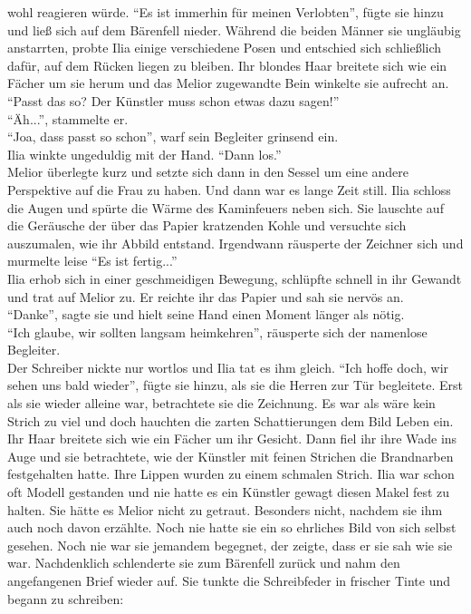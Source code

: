 wohl reagieren würde. ``Es ist immerhin für meinen Verlobten'', fügte sie hinzu und ließ sich auf 
dem Bärenfell nieder. Während die beiden Männer sie ungläubig anstarrten, probte Ilia einige 
verschiedene Posen und entschied sich schließlich dafür, auf dem Rücken liegen zu bleiben. Ihr 
blondes Haar breitete sich wie ein Fächer um sie herum und das Melior zugewandte Bein winkelte sie 
aufrecht an. ``Passt das so? Der Künstler muss schon etwas dazu sagen!''\\
``Äh...'', stammelte er.\\
``Joa, dass passt so schon'', warf sein Begleiter grinsend ein.\\
Ilia winkte ungeduldig mit der Hand. ``Dann los.''\\
Melior überlegte kurz und setzte sich dann in den Sessel um eine andere Perspektive auf die Frau zu 
haben. Und dann war es lange Zeit still. Ilia schloss die Augen und spürte die Wärme des 
Kaminfeuers neben sich. Sie lauschte auf die Geräusche der über das Papier kratzenden Kohle und 
versuchte sich auszumalen, wie ihr Abbild entstand. Irgendwann räusperte der Zeichner sich und 
murmelte leise ``Es ist fertig...''\\
Ilia erhob sich in einer geschmeidigen Bewegung, schlüpfte schnell in ihr Gewandt und trat auf 
Melior zu. Er reichte ihr das Papier und sah sie nervös an.\\
``Danke'', sagte sie und hielt seine Hand einen Moment länger als nötig.\\
``Ich glaube, wir sollten langsam heimkehren'', räusperte sich der namenlose Begleiter.\\
Der Schreiber nickte nur wortlos und Ilia tat es ihm gleich. ``Ich hoffe doch, wir sehen uns bald 
wieder'', fügte sie hinzu, als sie die Herren zur Tür begleitete. Erst als sie wieder alleine war, 
betrachtete sie die Zeichnung. Es war als wäre kein Strich zu viel und doch hauchten die zarten 
Schattierungen dem Bild Leben ein. Ihr Haar breitete sich wie ein Fächer um ihr Gesicht. Dann fiel 
ihr ihre Wade ins Auge und sie betrachtete, wie der Künstler mit feinen Strichen die Brandnarben 
festgehalten hatte. Ihre Lippen wurden zu einem schmalen Strich. Ilia war schon oft Modell 
gestanden und nie hatte es ein Künstler gewagt diesen Makel fest zu halten. Sie hätte es Melior 
nicht zu getraut. Besonders nicht, nachdem sie ihm auch noch davon erzählte. Noch nie hatte sie ein 
so ehrliches Bild von sich selbst gesehen. Noch nie war sie jemandem begegnet, der zeigte, dass er 
sie sah wie sie war. Nachdenklich schlenderte sie zum Bärenfell zurück und nahm den angefangenen 
Brief wieder auf. Sie tunkte die Schreibfeder in frischer Tinte und begann zu schreiben:


